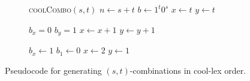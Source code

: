 \begin{figure}[H]
    \centering
    \begin{subfigure}[t]{0.275\textwidth}
        \centering
        \begin{algorithm}[H]
        \begin{algorithmic}
        \State \textsc{coolCombo}$(s,t)$
        \State $n \gets s+t$
        \State $b \gets 1^t 0^s$
        \State $x \gets t$
        \State $y \gets t$
        \State {}
        
            \State $b_x=0$
            \State $b_y=1$
            \State $x \gets x+1$
            \State $y \gets y+1$
            
                \State $b_x \gets 1$ %
                \State $b_1 \gets 0$ %
                    \State $x \gets 2$
                \EndIf
                \State $y \gets 1$
            \EndIf
        \EndWhile
        \end{algorithmic}
        \end{algorithm}

    \end{subfigure}
    \caption{Pseudocode for generating $(s,t)$-combinations in cool-lex order.}
    \label{fig:coolComboCode}
\end{figure}

